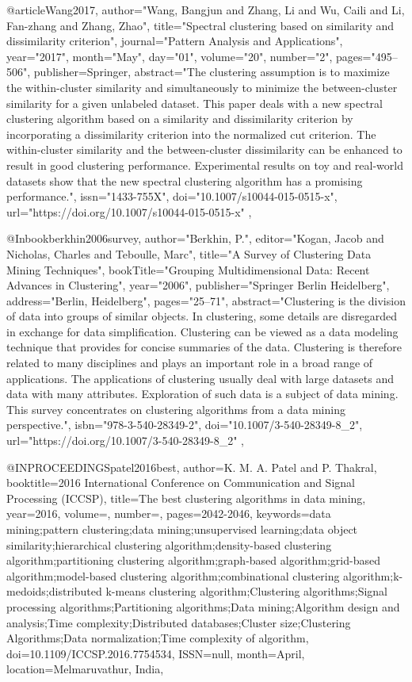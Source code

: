 @article{Wang2017,
author="Wang, Bangjun
and Zhang, Li
and Wu, Caili
and Li, Fan-zhang
and Zhang, Zhao",
title="Spectral clustering based on similarity and dissimilarity criterion",
journal="Pattern Analysis and Applications",
year="2017",
month="May",
day="01",
volume="20",
number="2",
pages="495--506",
publisher={Springer},
abstract="The clustering assumption is to maximize the within-cluster similarity and simultaneously to minimize the between-cluster similarity for a given unlabeled dataset. This paper deals with a new spectral clustering algorithm based on a similarity and dissimilarity criterion by incorporating a dissimilarity criterion into the normalized cut criterion. The within-cluster similarity and the between-cluster dissimilarity can be enhanced to result in good clustering performance. Experimental results on toy and real-world datasets show that the new spectral clustering algorithm has a promising performance.",
issn="1433-755X",
doi="10.1007/s10044-015-0515-x",
url="https://doi.org/10.1007/s10044-015-0515-x"
},

@Inbook{berkhin2006survey,
author="Berkhin, P.",
editor="Kogan, Jacob
and Nicholas, Charles
and Teboulle, Marc",
title="A Survey of Clustering Data Mining Techniques",
bookTitle="Grouping Multidimensional Data: Recent Advances in Clustering",
year="2006",
publisher="Springer Berlin Heidelberg",
address="Berlin, Heidelberg",
pages="25--71",
abstract="Clustering is the division of data into groups of similar objects. In clustering, some details are disregarded in exchange for data simplification. Clustering can be viewed as a data modeling technique that provides for concise summaries of the data. Clustering is therefore related to many disciplines and plays an important role in a broad range of applications. The applications of clustering usually deal with large datasets and data with many attributes. Exploration of such data is a subject of data mining. This survey concentrates on clustering algorithms from a data mining perspective.",
isbn="978-3-540-28349-2",
doi="10.1007/3-540-28349-8_2",
url="https://doi.org/10.1007/3-540-28349-8_2"
},


@INPROCEEDINGS{patel2016best, 
author={K. M. A. {Patel} and P. {Thakral}}, 
booktitle={2016 International Conference on Communication and Signal Processing (ICCSP)}, 
title={The best clustering algorithms in data mining}, 
year={2016}, 
volume={}, 
number={}, 
pages={2042-2046}, 
keywords={data mining;pattern clustering;data mining;unsupervised learning;data object similarity;hierarchical clustering algorithm;density-based clustering algorithm;partitioning clustering algorithm;graph-based algorithm;grid-based algorithm;model-based clustering algorithm;combinational clustering algorithm;k-medoids;distributed k-means clustering algorithm;Clustering algorithms;Signal processing algorithms;Partitioning algorithms;Data mining;Algorithm design and analysis;Time complexity;Distributed databases;Cluster size;Clustering Algorithms;Data normalization;Time complexity of algorithm}, 
doi={10.1109/ICCSP.2016.7754534}, 
ISSN={null}, 
month={April},
location={Melmaruvathur, India},
}

